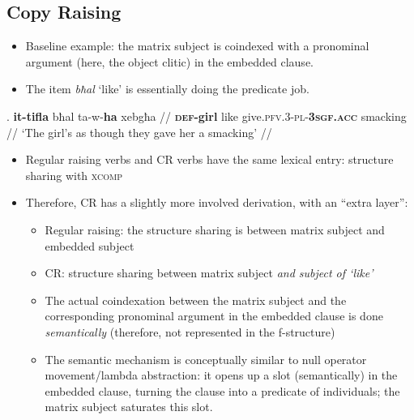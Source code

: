 \documentclass[11pt]{article}
\begin{document}
\subsection{Copy Raising}
\begin{itemize}
\item Baseline example: the matrix subject is coindexed with a pronominal argument (here, the object clitic) in the embedded clause.

\item The item \textit{bħal} `like' is essentially doing the predicate job.
\end{itemize}


\ex. \begingl
\gla \textbf{it-tifla} bħal ta-w-\textbf{ha} xebgħa //
\glb \textbf{\textsc{def}-girl} like give.\textsc{pfv.3-pl-\textbf{3sgf.acc}} smacking //
 \glft `The girl's as though they gave her a smacking' //
\endgl



\begin{itemize}
\item Regular raising verbs and CR verbs have the same lexical entry: structure sharing with \textsc{xcomp}

\item Therefore, CR has a slightly more involved derivation, with an ``extra layer'': \begin{itemize}
    \item Regular raising: the structure sharing is between matrix subject and embedded subject
    \item CR: structure sharing between matrix subject \emph{and subject of `like'}
    \item The actual coindexation between the matrix subject and the corresponding pronominal argument in the embedded clause is done \emph{semantically} (therefore, not represented in the f-structure)
    \item The semantic mechanism is conceptually similar to null operator movement\slash lambda abstraction: it opens up a slot (semantically) in the embedded clause, turning the clause into a predicate of individuals; the matrix subject saturates this slot.
    \end{itemize}
\end{itemize}

\end{document}
